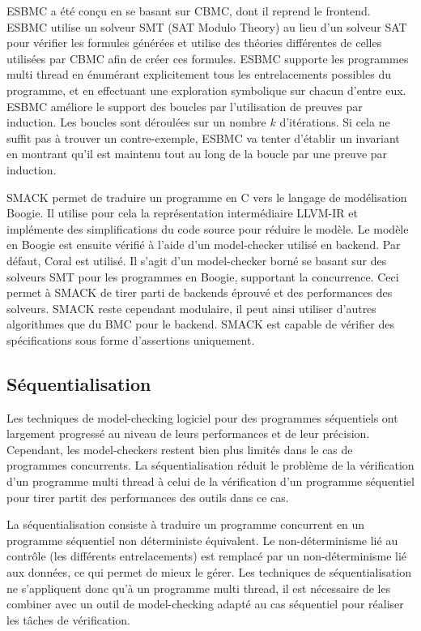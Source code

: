 ESBMC\cite{ESBMC} a été conçu en se basant sur CBMC, dont il reprend le
frontend. ESBMC utilise un solveur SMT (SAT Modulo Theory) au lieu d'un solveur
SAT pour vérifier les formules générées et utilise des théories différentes de
celles utilisées par CBMC afin de créer ces formules. ESBMC supporte les
programmes multi thread en énumérant explicitement tous les entrelacements
possibles du programme, et en effectuant une exploration symbolique sur chacun
d'entre eux. ESBMC améliore le support des boucles par l'utilisation de preuves
par induction\cite{ESBMC_k_induction}. Les boucles sont déroulées sur un nombre
\(k\) d'itérations. Si cela ne suffit pas à trouver un contre-exemple, ESBMC va
tenter d'établir un invariant en montrant qu'il est maintenu tout au long de la
boucle par une preuve par induction.

SMACK\cite{SMACK} permet de traduire un programme en C vers le langage de
modélisation Boogie. Il utilise pour cela la représentation
intermédiaire LLVM-IR et implémente des simplifications du code source pour
réduire le modèle. Le modèle en Boogie est ensuite vérifié à l'aide d'un
model-checker utilisé en backend. Par défaut, Coral est utilisé. Il s'agit d'un
model-checker borné se basant sur des solveurs SMT pour les programmes en
Boogie, supportant la concurrence. Ceci permet à SMACK de tirer parti de
backends éprouvé et des performances des solveurs. SMACK reste cependant
modulaire, il peut ainsi utiliser d'autres algorithmes que du BMC pour le
backend. SMACK est capable de vérifier des spécifications sous forme d'assertions
uniquement.

\subsection{Séquentialisation}

Les techniques de model-checking logiciel pour des programmes séquentiels ont
largement progressé au niveau de leurs performances et de leur précision.
Cependant, les model-checkers restent bien plus limités dans le cas de
programmes concurrents. La séquentialisation réduit le problème de la
vérification d'un programme multi thread à celui de la vérification d'un
programme séquentiel pour tirer partit des performances des outils dans ce cas.

La séquentialisation consiste à traduire un programme concurrent en un programme
séquentiel non déterministe équivalent. Le non-déterminisme lié au contrôle (les
différents entrelacements) est remplacé par un non-déterminisme lié aux données,
ce qui permet de mieux le gérer. Les techniques de séquentialisation ne
s'appliquent donc qu'à un programme multi thread, il est nécessaire de les
combiner avec un outil de model-checking adapté au cas séquentiel pour réaliser
les tâches de vérification.


